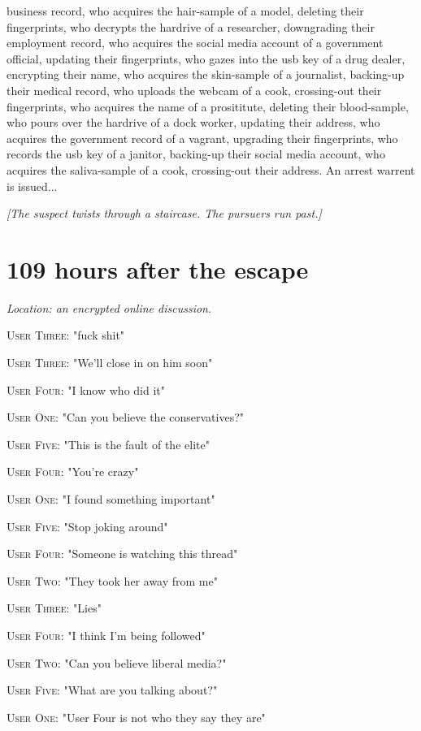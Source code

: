 \documentclass{report}
\begin{document}
business record, who acquires the hair-sample of a model, deleting their fingerprints, who decrypts the hardrive of a researcher, downgrading their employment record, who acquires the social media account of a government official, updating their fingerprints, who gazes into the usb key of a drug dealer, encrypting their name, who acquires the skin-sample of a journalist, backing-up their medical record, who uploads the webcam of a cook, crossing-out their fingerprints, who acquires the name of a prosititute, deleting their blood-sample, who pours over the hardrive of a dock worker, updating their address, who acquires the government record of a vagrant, upgrading their fingerprints, who records the usb key of a janitor, backing-up their social media account, who acquires the saliva-sample of a cook, crossing-out their address. An arrest warrent is issued...

\textit{[The suspect twists through a staircase. The pursuers run past.]}


\section*{109 \small{hours after the escape}}

\textit{Location: an encrypted online discussion}. 

\textsc{User Three}: "fuck shit" 

\textsc{User Three}: "We'll close in on him soon" 

\textsc{User Four}: "I know who did it" 

\textsc{User One}: "Can you believe the conservatives?" 

\textsc{User Five}: "This is the fault of the elite" 

\textsc{User Four}: "You're crazy" 

\textsc{User One}: "I found something important" 

\textsc{User Five}: "Stop joking around" 

\textsc{User Four}: "Someone is watching this thread" 

\textsc{User Two}: "They took her away from me" 

\textsc{User Three}: "Lies" 

\textsc{User Four}: "I think I'm being followed" 

\textsc{User Two}: "Can you believe liberal media?" 

\textsc{User Five}: "What are you talking about?" 

\textsc{User One}: "User Four is not who they say they are" 
\end{document}

